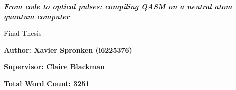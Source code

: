 \documentclass[12pt]{article}
\begin{document}
\begin{titlepage}
    \begin{center}
        \textbf{}
        \vspace{3cm}
        
        \LARGE
        \textbf{\textit{From code to optical pulses: compiling QASM on a neutral atom quantum computer}}
        
        \vspace{1cm}
        Final Thesis
        
        \vspace{0.7cm}
        \textbf{Author: Xavier Spronken (i6225376)}
        
        \vspace{0.5cm}
        \normalsize
        
        \vspace{1cm}
        \large
        \textbf{Supervisor: Claire Blackman}
        
        \vspace{1cm}
        \textbf{Total Word Count: 3251 \\} 


        \vspace{1cm}
        
        

        
    \end{center}
\end{titlepage}


\tableofcontents

\newpage







\newpage

 
\appendix

\end{document}
